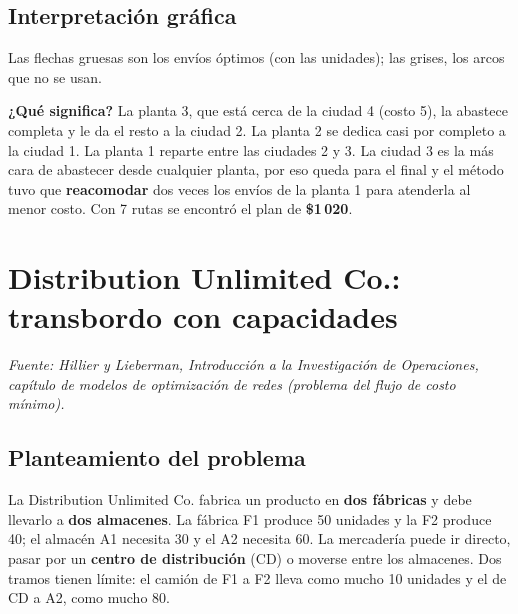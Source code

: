 \documentclass[11pt,a4paper]{article}
\begin{document}
\subsection*{Interpretación gráfica}
\noindent
\begin{minipage}[c]{0.46\textwidth}\centering
{}
\end{minipage}\hfill
\begin{minipage}[c]{0.51\textwidth}
Las flechas gruesas son los envíos óptimos (con las unidades); las grises, los arcos que no se usan.

\textbf{¿Qué significa?} La planta 3, que está cerca de la ciudad 4 (costo 5), la abastece completa y le da el resto a
la ciudad 2. La planta 2 se dedica casi por completo a la ciudad 1. La planta 1 reparte entre las ciudades 2 y 3. La
ciudad 3 es la más cara de abastecer desde cualquier planta, por eso queda para el final y el método tuvo que
\textbf{reacomodar} dos veces los envíos de la planta 1 para atenderla al menor costo. Con 7 rutas se encontró el plan
de \textbf{\$1\,020}.
\end{minipage}

\section{Distribution Unlimited Co.: transbordo con capacidades}
\textit{Fuente: Hillier y Lieberman, Introducción a la Investigación de Operaciones, capítulo de modelos de optimización
de redes (problema del flujo de costo mínimo).}

\subsection*{Planteamiento del problema}
La Distribution Unlimited Co. fabrica un producto en \textbf{dos fábricas} y debe llevarlo a \textbf{dos almacenes}.
La fábrica F1 produce 50 unidades y la F2 produce 40; el almacén A1 necesita 30 y el A2 necesita 60. La mercadería
puede ir directo, pasar por un \textbf{centro de distribución} (CD) o moverse entre los almacenes. Dos tramos tienen
límite: el camión de F1 a F2 lleva como mucho 10 unidades y el de CD a A2, como mucho 80.
\end{document}
